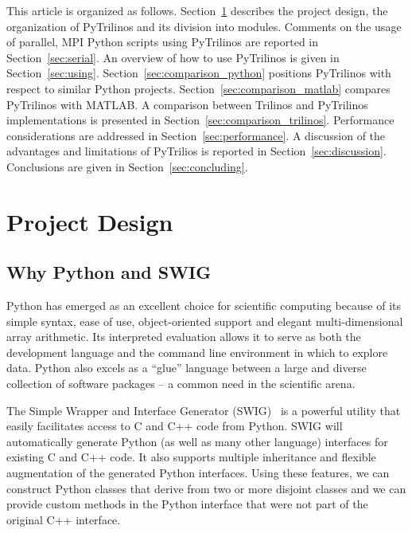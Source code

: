 \documentclass[acmtocl]{acmtrans2m}
\begin{document}
\smallskip

This article is organized as follows. Section~\ref{sec:design}
describes the project design, the organization of PyTrilinos and its
division into modules. Comments on the usage of parallel, MPI Python
scripts using PyTrilinos are reported in Section~\ref{sec:serial}.  An
overview of how to use PyTrilinos is given in Section~\ref{sec:using}.
Section~\ref{sec:comparison_python} positions PyTrilinos with respect
to similar Python projects.  Section~\ref{sec:comparison_matlab}
compares PyTrilinos with MATLAB.  A comparison between Trilinos and
PyTrilinos implementations is presented in
Section~\ref{sec:comparison_trilinos}.  Performance considerations are
addressed in Section~\ref{sec:performance}. A discussion of the advantages and
limitations of PyTrilios is reported in Section~\ref{sec:discussion}.
Conclusions are given in Section~\ref{sec:concluding}.

\section{Project Design}
\label{sec:design}

\subsection{Why Python and SWIG}
\label{sec:why}

Python has emerged as an excellent choice for scientific computing
because of its simple syntax, ease of use, object-oriented support and
elegant multi-dimensional array arithmetic. Its interpreted evaluation
allows it to serve as both the development language and the command
line environment in which to explore data. Python also excels as a
``glue'' language between a large and diverse collection of software
packages -- a common need in the scientific arena.

The Simple Wrapper and Interface Generator (SWIG)~\cite{swig} is a
powerful utility that easily facilitates access to C and C++ code from
Python.  SWIG will automatically generate Python (as well as many
other language) interfaces for existing C and C++ code.  It also
supports multiple inheritance and flexible augmentation of the
generated Python interfaces.  Using these features, we can construct
Python classes that derive from two or more disjoint classes and we
can provide custom methods in the Python interface that were not part
of the original C++ interface.
\end{document}
